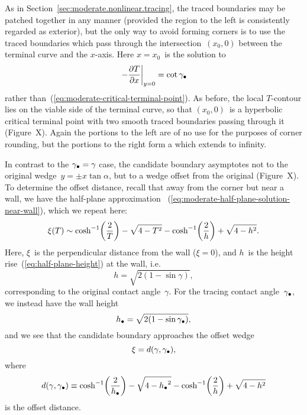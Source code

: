 As in Section~\ref{sec:moderate.nonlinear.tracing},
the traced boundaries may be patched together in any manner
(provided the region to the left is consistently regarded as exterior),
but the only way to avoid forming corners
is to use the traced boundaries which pass through
the intersection~$(x_0, 0)$ between the
terminal curve and the $x$-axis.
Here $x = x_0$~is the solution to
\begin{equation}
  \eval*{-\pder{T}{x}}_{y=0} = \cot\tr{\gamma}
  \label{eq:moderate-critical-terminal-point-different-angle}
\end{equation}
rather than~(\ref{eq:moderate-critical-terminal-point}).
As before,
the local $T$-contour lies on the viable side of the terminal curve,
so that $(x_0, 0)$~is a hyperbolic critical terminal point
with two smooth traced boundaries passing through it
(Figure~X). %
Again the portions to the left are of no use
for the purposes of corner rounding,
but the portions to the right form a 
which extends to infinity.

In contrast to the $\gamma_\bullet = \gamma$ case,
the candidate boundary asymptotes
not to the original wedge~$y = \pm x \tan\alpha$,
but to a wedge offset from the original
(Figure~X). %
To determine the offset distance,
recall that away from the corner but near a wall,
we have the half-plane approximation~%
  (\ref{eq:moderate-half-plane-solution-near-wall}),
which we repeat here:
\begin{equation}
  \xi (T) \asy
    \cosh^{-1} \roundbr*{\frac{2}{T}} - \sqrt{4 - T^2}
    - \cosh^{-1} \roundbr*{\frac{2}{h}} + \sqrt{4 - h^2}.
    \label{eq:moderate-half-plane-solution-near-wall-repeat}
\end{equation}
Here, $\xi$~is the perpendicular distance from the wall ($\xi = 0$),
and $h$~is the height rise~(\ref{eq:half-plane-height}) at the wall,
i.e.
\begin{equation}
  h = \sqrt{2 (1 - \sin\gamma)},
  \label{eq:half-plane-height-repeat}
\end{equation}
corresponding to the original contact angle~$\gamma$.
For the tracing contact angle~$\gamma_\bullet$,
we instead have the wall height
\begin{equation}
  h_\bullet = \sqrt{2 (1 - \sin\gamma_\bullet)},
  \label{eq:half-plane-height-different-angle}
\end{equation}
and we see that the candidate boundary approaches the offset wedge
\begin{equation}
  \xi = d (\gamma, \gamma_\bullet),
  \label{eq:moderate-offset-wedge}
\end{equation}
where
\begin{equation}
  d (\gamma, \tr{\gamma}) \ideq
    \cosh^{-1} \roundbr*{\frac{2}{\tr{h}}} - \sqrt{4 - {\tr{h}}^2}
    - \cosh^{-1} \roundbr*{\frac{2}{h}} + \sqrt{4 - h^2}
  \label{eq:moderate-offset-distance}
\end{equation}
is the offset distance.

